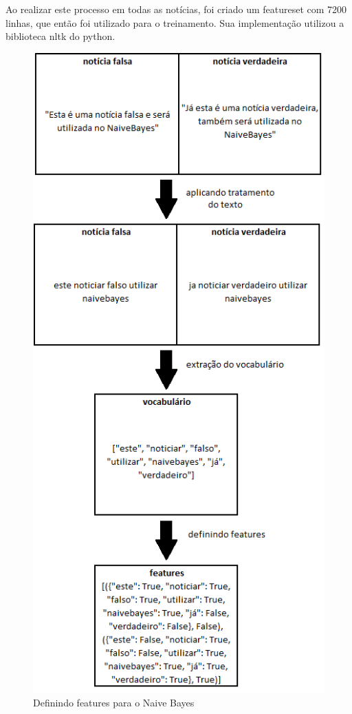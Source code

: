 \documentclass[conference]{IEEEtran}
\begin{document}
Ao realizar este processo em todas as notícias, foi criado um featureset com 7200 linhas, que então foi utilizado para o treinamento. Sua implementação utilizou a biblioteca nltk do python.

\begin{figure}[htbp]
\centerline{\includegraphics[scale=0.6]{naive_bayes.png}}
\caption{Definindo features para o Naive Bayes}
\label{fig}
\end{figure}
\end{document}
